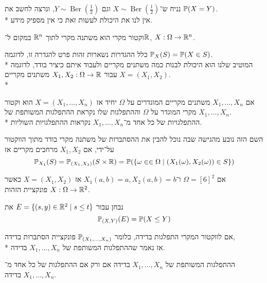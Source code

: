 \begin{example}
	נניח ש־$X \sim \operatorname{Ber}(\frac{1}{2})$ וגם $Y \sim \operatorname{Ber}(\frac{1}{2})$, ונרצה לחשב את $\mathbb{P}(X = Y)$. \\*
	אין לנו את היכולת לעשות זאת כי אין מספיק מידע.
\end{example}
\begin{definition}
	וקטור מקרי הוא משתנה מקרי לתוך $\mathbb{R}^n$ במקום ל־$\mathbb{R}$, $X : \Omega \to \mathbb{R}^n$.
\end{definition}
כלל ההגדרות נשארות זהות פרט להגדרה זו, לדוגמה $\mathbb{P}_X(S) = \mathbb{P}(X \in S)$. \\*
המוטיב שלנו הוא היכולת לבנות כמה משתנים מקריים ולעבוד איתם כיציר בודד, לדוגמה $X = (X_1, X_2)$ עבור $X_1, X_2 : \Omega \to \mathbb{R}$ משתנים מקריים. \\*
\begin{definition}
	אם $X_1, \dots, X_n$ משתנים מקריים המוגדרים על $\Omega$ יחיד אז $X = (X_1, \dots, X_n)$ הוא וקטור מקרי המוגדר על $\Omega$ וההתפלגות שלו נקראת ההתפלגות המשותפת של $X_1, \dots, X_n$. \\*
	ההתפלגויות של כל אחד מ־$X_1, \dots, X_n$ נקראות ההתפלגויות השוליות.
\end{definition}
השם הזה נובע מהגישה שבה נוכל להבין את ההסתברות של משתנה מקרי בודד מתוך הווקטור על־ידי, אם $X_1, X_2$ מרחבים מקריים אז
\[
	\mathbb{P}_{X_1}(S) = \mathbb{P}_{(X_1, X_2)}(S \times \mathbb{R}) = \mathbb{P}(\{\omega \in \in \Omega \mid (X_1(\omega), X_2(\omega)) \in S\})
\]
\begin{example}
	אם $\Omega = {[6]}^2$ ו־$X_1(a, b) = a, X_2(a, b) = b$ אז $X = (X_1, X_2)$ כאשר $X : \Omega \to \mathbb{R}^2$ פונקציית הזהות.
\end{example}
\begin{example}
	נבחן עבור $E = \{(s, y) \in \mathbb{R}^2 \mid s \le t\}$ את
	\[
		\mathbb{P}_{(X, Y)}(E)
		= \mathbb{P}(X \le Y)
	\]
\end{example}
\begin{definition}
	אם לווקטור המקרי התפלגות בדידה, כלומר $\mathbb{P}_{(X_1, \dots, X_n)}$ פונקציית הסתברות בדידה, \\*
	אז נאמר שההתפלגות המשותפת של $X_1, \dots, X_n$ בדידה.
\end{definition}
\begin{proposition}
	ההתפלגות המשותפת של $X_1, \dots, X_n$ בדידה אם ורק אם ההתפלגות של כל אחד מ־$X_1, \dots, X_n$ בדידה.
\end{proposition}
